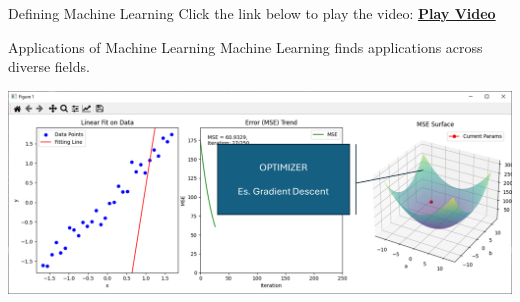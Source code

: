 \documentclass[11pt]{beamer}
\begin{document}
\begin{frame}{Defining Machine Learning}
	Click the link below to play the video: \href{run:training-explication.mp4}{\textbf{Play Video}}
\end{frame}
\begin{frame}{Applications of Machine Learning}
	Machine Learning finds applications across diverse fields.
	\begin{center}
	\includegraphics[scale=0.35]{../05-pictures/lesson-1-1_pic_5.png}
	\end{center}
\end{frame}
%
\end{document}
